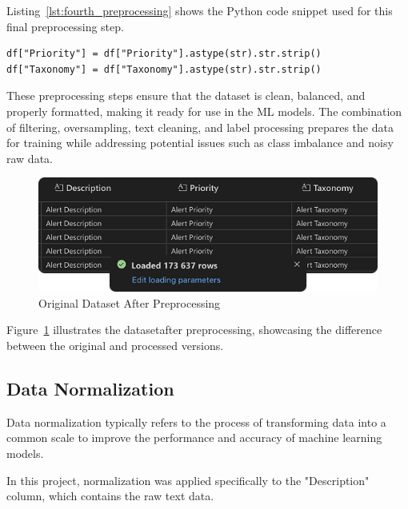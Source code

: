 Listing~\ref{lst:fourth_preprocessing} shows the Python code snippet used for this final preprocessing step.

\vspace{0.2cm}
\noindent
\begin{minipage}{\linewidth}
\begin{verbatim}
df["Priority"] = df["Priority"].astype(str).str.strip()
df["Taxonomy"] = df["Taxonomy"].astype(str).str.strip()
\end{verbatim}
\label{lst:fourth_preprocessing}
\end{minipage}
\vspace{0.1cm}

These preprocessing steps ensure that the dataset is clean, balanced, and properly formatted, making it ready for use in the ML models. 
The combination of filtering, oversampling, text cleaning, and label processing prepares the data for training while addressing potential issues such as class imbalance and noisy raw data.

\begin{figure}[h!]
    \centering
    \includegraphics[width=\textwidth]{ch3/assets/dataset_processed.png}
    \caption{Original Dataset After Preprocessing}
    \label{fig:dataset_processed}
\end{figure}

Figure~\ref{fig:dataset_processed} illustrates the dataset\footnotemark[\value{footnote}] after preprocessing, showcasing the difference between the original and processed versions.

\subsection{Data Normalization}
Data normalization typically refers to the process of transforming data into a common scale to improve the performance and accuracy of machine learning models. 

In this project, normalization was applied specifically to the "Description" column, which contains the raw text data. 

